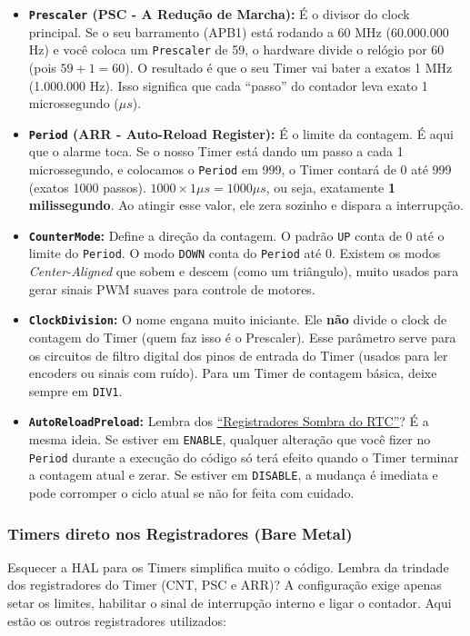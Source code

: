 \documentclass[12pt,a4paper]{article}
\begin{document}
\begin{itemize}
    \item \textbf{\texttt{Prescaler} (PSC - A Redução de Marcha):} É o divisor do clock principal. Se o seu barramento (APB1) está rodando a 60 MHz (60.000.000 Hz) e você coloca um \texttt{Prescaler} de 59, o hardware divide o relógio por 60 (pois $59 + 1 = 60$). O resultado é que o seu Timer vai bater a exatos 1 MHz (1.000.000 Hz). Isso significa que cada ``passo'' do contador leva exato 1 microssegundo ($\mu s$).
    
    \item \textbf{\texttt{Period} (ARR - Auto-Reload Register):} É o limite da contagem. É aqui que o alarme toca. Se o nosso Timer está dando um passo a cada 1 microssegundo, e colocamos o \texttt{Period} em 999, o Timer contará de 0 até 999 (exatos 1000 passos). $1000 \times 1\mu s = 1000 \mu s$, ou seja, exatamente \textbf{1 milissegundo}. Ao atingir esse valor, ele zera sozinho e dispara a interrupção.
    
    \item \textbf{\texttt{CounterMode}:} Define a direção da contagem. O padrão \texttt{UP} conta de 0 até o limite do \texttt{Period}. O modo \texttt{DOWN} conta do \texttt{Period} até 0. Existem os modos \textit{Center-Aligned} que sobem e descem (como um triângulo), muito usados para gerar sinais PWM suaves para controle de motores.
    
    \item \textbf{\texttt{ClockDivision}:} O nome engana muito iniciante. Ele \textbf{não} divide o clock de contagem do Timer (quem faz isso é o Prescaler). Esse parâmetro serve para os circuitos de filtro digital dos pinos de entrada do Timer (usados para ler encoders ou sinais com ruído). Para um Timer de contagem básica, deixe sempre em \texttt{DIV1}.
    
    \item \textbf{\texttt{AutoReloadPreload}:} Lembra dos \hyperref[rtc:sombra]{``Registradores Sombra do RTC''}? É a mesma ideia. Se estiver em \texttt{ENABLE}, qualquer alteração que você fizer no \texttt{Period} durante a execução do código só terá efeito quando o Timer terminar a contagem atual e zerar. Se estiver em \texttt{DISABLE}, a mudança é imediata e pode corromper o ciclo atual se não for feita com cuidado.
\end{itemize}

\subsubsection{Timers direto nos Registradores (Bare Metal)}
Esquecer a HAL para os Timers simplifica muito o código. Lembra da trindade dos registradores do Timer (CNT, PSC e ARR)? A configuração exige apenas setar os limites, habilitar o sinal de interrupção interno e ligar o contador. Aqui estão os outros registradores utilizados:
\end{document}
